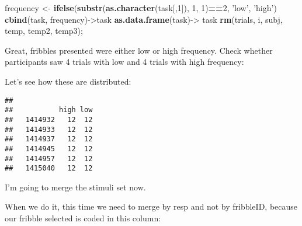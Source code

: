 \documentclass[
]{article}
\newenvironment{Shaded}{\begin{snugshade}}{\end{snugshade}}
\newcommand{\CommentTok}[1]{\textcolor[rgb]{0.56,0.35,0.01}{\textit{#1}}}
\newcommand{\DataTypeTok}[1]{\textcolor[rgb]{0.13,0.29,0.53}{#1}}
\newcommand{\DecValTok}[1]{\textcolor[rgb]{0.00,0.00,0.81}{#1}}
\newcommand{\KeywordTok}[1]{\textcolor[rgb]{0.13,0.29,0.53}{\textbf{#1}}}
\newcommand{\NormalTok}[1]{#1}
\newcommand{\OperatorTok}[1]{\textcolor[rgb]{0.81,0.36,0.00}{\textbf{#1}}}
\newcommand{\OtherTok}[1]{\textcolor[rgb]{0.56,0.35,0.01}{#1}}
\newcommand{\StringTok}[1]{\textcolor[rgb]{0.31,0.60,0.02}{#1}}
\begin{document}
\begin{Shaded}
\begin{Highlighting}[]
\NormalTok{frequency <-}\StringTok{ }\KeywordTok{ifelse}\NormalTok{(}\KeywordTok{substr}\NormalTok{(}\KeywordTok{as.character}\NormalTok{(task[,}\DecValTok{1}\NormalTok{]), }\DecValTok{1}\NormalTok{, }\DecValTok{1}\NormalTok{)}\OperatorTok{==}\DecValTok{2}\NormalTok{, }\StringTok{'low'}\NormalTok{, }\StringTok{'high'}\NormalTok{)}
\KeywordTok{cbind}\NormalTok{(task, frequency)->task}
\KeywordTok{as.data.frame}\NormalTok{(task)->}\StringTok{ }\NormalTok{task}
\KeywordTok{rm}\NormalTok{(trials, i, subj, temp, temp2, temp3);}
\end{Highlighting}
\end{Shaded}

Great, fribbles presented were either low or high frequency. Check
whether participants saw 4 trials with low and 4 trials with high
frequency:

Let's see how these are distributed:

\begin{Shaded}
\end{Shaded}

\begin{verbatim}
##          
##           high low
##   1414932   12  12
##   1414933   12  12
##   1414937   12  12
##   1414945   12  12
##   1414957   12  12
##   1415040   12  12
\end{verbatim}

I'm going to merge the stimuli set now.

When we do it, this time we need to merge by resp and not by fribbleID,
because our fribble selected is coded in this column:

\begin{Shaded}
\end{Shaded}
\end{document}
